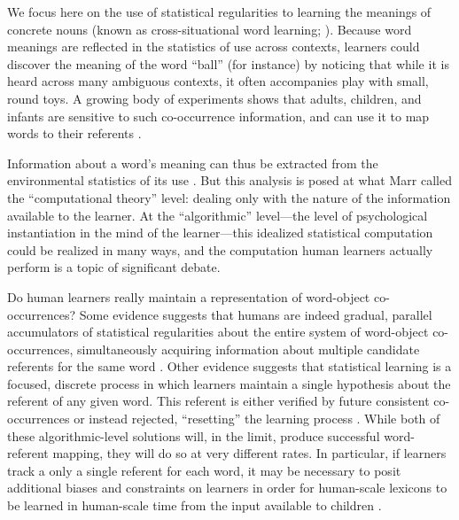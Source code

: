 \documentclass{pnastwo}
\begin{document}
\begin{article}
We focus here on the use of statistical regularities to learning the meanings of concrete nouns (known as cross-situational word learning; \citealp{Pinker1989, Siskind1996, Yu2007}). Because word meanings are reflected in the statistics of use across contexts, learners could discover the meaning of the word ``ball'' (for instance) by noticing that while it is heard across many ambiguous contexts, it often accompanies play with small, round toys. A growing body of experiments shows that adults, children, and infants are sensitive to such co-occurrence information, and can use it to map words to their referents \citep{Yu2007, Smith2008, Scott2012, Vlach2013}.

Information about a word's meaning can thus be extracted from the environmental statistics of its use \cite{Frank2009a}. But this analysis is posed at what Marr \citep{Marr1982} called the ``computational theory'' level: dealing only with the nature of the information available to the learner. At the ``algorithmic'' level---the level of psychological instantiation in the mind of the learner---this idealized statistical computation could be realized in many ways, and the computation human learners actually perform is a topic of significant debate. 

Do human learners really maintain a representation of word-object co-occurrences? Some evidence suggests that humans are indeed gradual, parallel accumulators of statistical regularities about the entire system of word-object co-occurrences, simultaneously acquiring information about multiple candidate referents for the same word \citep{Vouloumanos2008, McMurray2012, Yurovsky2014}. Other evidence suggests that statistical learning is a focused, discrete process in which learners maintain a single hypothesis about the referent of any given word. This referent is either verified by future consistent co-occurrences or instead rejected, ``resetting'' the learning process \citep{Medina2011, Trueswell2013}. While both of these algorithmic-level solutions will, in the limit, produce successful word-referent mapping, they will do so at very different rates. In particular, if learners track a only a single referent for each word, it may be necessary to posit additional biases and constraints on learners in order for human-scale lexicons to be learned in human-scale time from the input available to children \citep{Vogt2012}.


\end{article}
\end{document}
